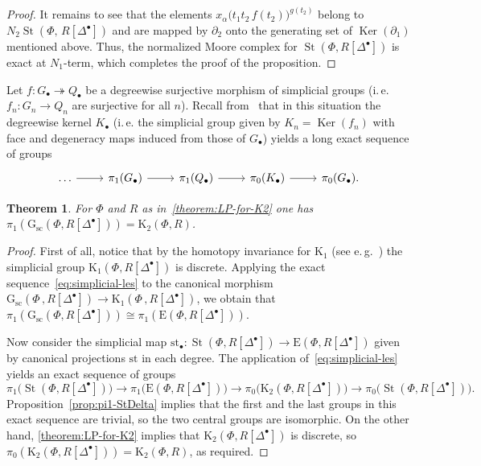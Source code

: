 \documentclass[oneside, 11pt]{amsart} \pdfoutput=1
\newcommand{\Ker}{\mathop{\mathrm{Ker}}\nolimits}
\newcommand{\K}{{\mathrm{K}}}
\newcommand{\St}{\mathop{\mathrm{St}}\nolimits}
\newcommand{\E}{\mathrm{E}}
\newcommand{\Gsc}{\mathrm{G}_\mathrm{sc}}
\numberwithin{equation}{section}
\newtheorem{theorem}[lemma]{Theorem}
\theoremstyle{definition}
\begin{document}
\begin{proof}
It remains to see that the elements $x_{\alpha}\big(t_1t_2\,f(t_2)\big)^{g(t_2)}$ belong to $N_2\St(\Phi,\,R[\Delta^\bullet])$ and are mapped by $\partial_2$ onto the generating set of $\Ker(\partial_1)$ mentioned above. Thus, the normalized Moore complex for $\St(\Phi, R[\Delta^\bullet])$ is exact at $N_1$-term, which completes the proof of the proposition. \end{proof}

Let $f\colon G_\bullet\twoheadrightarrow Q_\bullet$ be a degreewise surjective morphism of simplicial groups (i.\,e. $f_n\colon G_n\to Q_n$ are surjective for all $n$). Recall from~\cite[Theorem~1.3]{Ina75} that in this situation the degreewise kernel $K_\bullet$ (i.\,e. the simplicial group given by $K_n = \Ker(f_n)$ with face and degeneracy maps induced from those of $G_\bullet$) yields a long exact sequence of groups
\begin{equation} \label{eq:simplicial-les} \begin{tikzcd} \ldots \ar{r} & \pi_{1}(G_\bullet) \ar{r} & \pi_1(Q_\bullet) \ar{r} & \pi_0(K_\bullet) \ar{r} & \pi_0(G_\bullet). \end{tikzcd} \end{equation}

\begin{theorem} \label{theorem:pi1-GRDelta}
 For $\Phi$ and $R$ as in~\cref{theorem:LP-for-K2} one has $\pi_1(\Gsc(\Phi, R[\Delta^\bullet])) = \K_2(\Phi, R)$.
\end{theorem}
\begin{proof}
First of all, notice that by the homotopy invariance for $\K_1$ (see e.\,g.~\cite[Theorem~1.3]{Sta14}) the simplicial group $\K_1(\Phi, R[\Delta^\bullet])$ is discrete. Applying the exact sequence~\eqref{eq:simplicial-les} to the canonical morphism $\Gsc(\Phi\,,R[\Delta^\bullet]) \to \K_1(\Phi\,,R[\Delta^\bullet])$, we obtain that $\pi_1(\Gsc(\Phi, R[\Delta^\bullet])) \cong \pi_1(\E(\Phi, R[\Delta^\bullet]))$.
 
Now consider the simplicial map $\mathrm{st}_\bullet \colon \St(\Phi, R[\Delta^\bullet]) \to \E(\Phi, R[\Delta^\bullet])$ given by canonical projections $\mathrm{st}$ in each degree. The application of~\eqref{eq:simplicial-les} yields an exact sequence of groups
\[
\pi_1\bigl(\St(\Phi, R[\Delta^\bullet])\bigr) \to \pi_1\bigl(\E(\Phi, R[\Delta^\bullet])\bigr) \to \pi_0\bigl(\K_2(\Phi, R[\Delta^\bullet])\bigr) \to \pi_0\bigl(\St(\Phi, R[\Delta^\bullet])\bigr).
\]
 Proposition~\ref{prop:pi1-StDelta} implies that the first and the last groups in this exact sequence are trivial, so the two central groups are isomorphic. On the other hand, \cref{theorem:LP-for-K2} implies that $\K_2(\Phi, R[\Delta^\bullet])$ is discrete, so $\pi_0(\K_2(\Phi, R[\Delta^\bullet])) = \K_2(\Phi, R)$, as required.
\end{proof}
\end{document}
